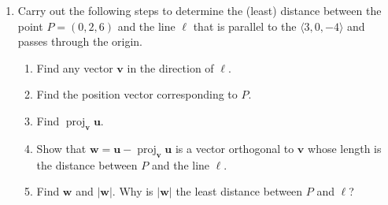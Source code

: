 \documentclass[%
]{article}
\newcommand{\vect}[1]{\mathbf{#1}}
\DeclareMathOperator{\proj}{proj}
\begin{document}
\begin{enumerate}








\item %
Carry out the following steps to determine the (least) distance between the point $P=(0,2,6)$ and the line $\ell$ that is parallel to the $\langle 3,0,-4\rangle$ and passes through the origin.
\begin{enumerate}
	\item Find any vector $\vect v$ in the direction of $\ell$.
	\item Find the position vector corresponding to $P$.
	\item Find $\proj_{\vect v}\vect u$.
	\item Show that $\vect w=\vect u-\proj_{\vect v}\vect u$ is a vector orthogonal to $\vect v$ whose length is the distance between $P$ and the line $\ell$.
	\item Find $\vect w$ and $|\vect w|$.  Why is $|\vect w|$ the least distance between $P$ and $\ell$?
\end{enumerate}


\end{enumerate}
\end{document}
